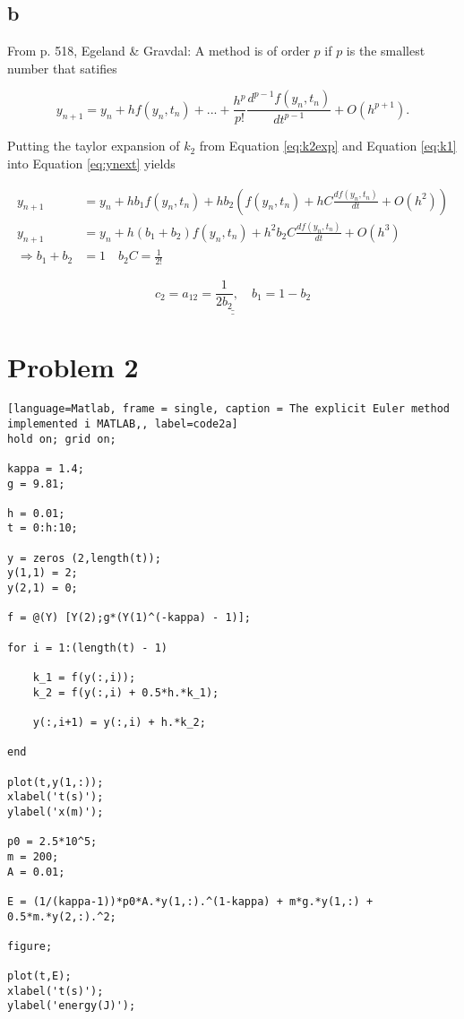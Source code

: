\documentclass{article}
\begin{document}
\subsection{b}

From p. 518, Egeland \& Gravdal:
A method is of order $p$ if $p$ is the smallest number that satifies

\begin{equation}\label{eq:order}
	y_{n+1} = y_n + hf(y_n,t_n) + ... + \frac{h^p}{p!} \frac{d^{p-1}f(y_n,t_n)}{dt^{p-1}} + O(h^{p+1}).
\end{equation}

Putting the taylor expansion of $k_2$ from Equation \ref{eq:k2exp} and Equation \ref{eq:k1} into Equation \ref{eq:ynext} yields

\begin{align*}
	y_{n+1} &= y_n + hb_1f(y_n,t_n) + hb_2(f(y_n,t_n) + hC\frac{df(y_n,t_n)}{dt} + O(h^2))\\
	y_{n+1} &= y_n + h(b_1+b_2)f(y_n,t_n) + h^2b_2C\frac{df(y_n,t_n)}{dt} + O(h^3) \\
	\Rightarrow b_1+b_2 &= 1 \quad b_2C = \frac{1}{2!}
\end{align*}

\begin{equation*}
	\underline{\underline{c_2 = a_{12} = \frac{1}{2b_2}, \quad b_1 = 1-b_2}}
\end{equation*}


\section{Problem 2}

\begin{lstlisting}[language=Matlab, frame = single, caption = The explicit Euler method implemented i MATLAB,, label=code2a]
hold on; grid on;

kappa = 1.4;
g = 9.81;

h = 0.01;
t = 0:h:10;

y = zeros (2,length(t));
y(1,1) = 2;
y(2,1) = 0;

f = @(Y) [Y(2);g*(Y(1)^(-kappa) - 1)];

for i = 1:(length(t) - 1)
    
    k_1 = f(y(:,i));
    k_2 = f(y(:,i) + 0.5*h.*k_1);
    
    y(:,i+1) = y(:,i) + h.*k_2;
    
end

plot(t,y(1,:));
xlabel('t(s)');
ylabel('x(m)');

p0 = 2.5*10^5;
m = 200;
A = 0.01;

E = (1/(kappa-1))*p0*A.*y(1,:).^(1-kappa) + m*g.*y(1,:) + 0.5*m.*y(2,:).^2;

figure;

plot(t,E);
xlabel('t(s)');
ylabel('energy(J)');
\end{lstlisting}
    





\end{document}
